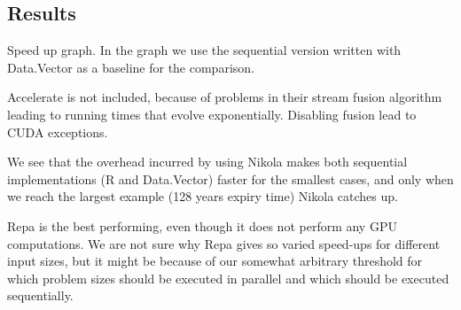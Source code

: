 \subsection{Results}
Speed up graph. In the graph we use the sequential version written
with Data.Vector as a baseline for the comparison.

Accelerate is not included, because of problems in their stream fusion
algorithm leading to running times that evolve
exponentially. Disabling fusion lead to CUDA exceptions.

We see that the overhead incurred by using Nikola makes both
sequential implementations (R and Data.Vector) faster for the smallest
cases, and only when we reach the largest example (128 years expiry
time) Nikola catches up.

Repa is the best performing, even though it does not perform any GPU
computations. We are not sure why Repa gives so varied speed-ups for
different input sizes, but it might be because of our somewhat
arbitrary threshold for which problem sizes should be executed in
parallel and which should be executed sequentially.


